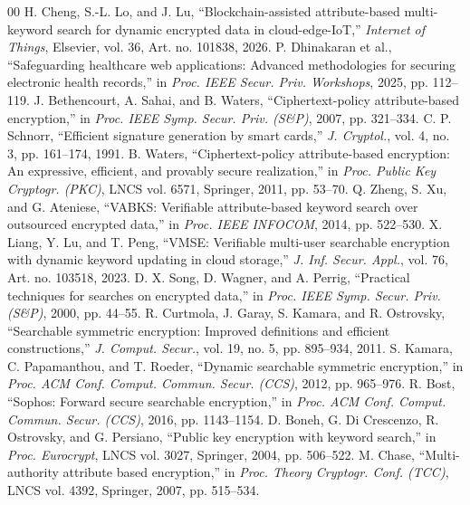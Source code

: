 \documentclass[journal,10pt,twocolumn]{IEEEtran}
\begin{document}

\begin{thebibliography}{00}
 H. Cheng, S.-L. Lo, and J. Lu, ``Blockchain-assisted attribute-based multi-keyword search for dynamic encrypted data in cloud-edge-IoT,'' \textit{Internet of Things}, Elsevier, vol. 36, Art. no. 101838, 2026.
 P. Dhinakaran et al., ``Safeguarding healthcare web applications: Advanced methodologies for securing electronic health records,'' in \textit{Proc. IEEE Secur. Priv. Workshops}, 2025, pp. 112–119.
 J. Bethencourt, A. Sahai, and B. Waters, ``Ciphertext-policy attribute-based encryption,'' in \textit{Proc. IEEE Symp. Secur. Priv. (S\&P)}, 2007, pp. 321–334.
 C. P. Schnorr, ``Efficient signature generation by smart cards,'' \textit{J. Cryptol.}, vol. 4, no. 3, pp. 161–174, 1991.
 B. Waters, ``Ciphertext-policy attribute-based encryption: An expressive, efficient, and provably secure realization,'' in \textit{Proc. Public Key Cryptogr. (PKC)}, LNCS vol. 6571, Springer, 2011, pp. 53–70.
 Q. Zheng, S. Xu, and G. Ateniese, ``VABKS: Verifiable attribute-based keyword search over outsourced encrypted data,'' in \textit{Proc. IEEE INFOCOM}, 2014, pp. 522–530.
 X. Liang, Y. Lu, and T. Peng, ``VMSE: Verifiable multi-user searchable encryption with dynamic keyword updating in cloud storage,'' \textit{J. Inf. Secur. Appl.}, vol. 76, Art. no. 103518, 2023.
 D. X. Song, D. Wagner, and A. Perrig, ``Practical techniques for searches on encrypted data,'' in \textit{Proc. IEEE Symp. Secur. Priv. (S\&P)}, 2000, pp. 44–55.
 R. Curtmola, J. Garay, S. Kamara, and R. Ostrovsky, ``Searchable symmetric encryption: Improved definitions and efficient constructions,'' \textit{J. Comput. Secur.}, vol. 19, no. 5, pp. 895–934, 2011.
 S. Kamara, C. Papamanthou, and T. Roeder, ``Dynamic searchable symmetric encryption,'' in \textit{Proc. ACM Conf. Comput. Commun. Secur. (CCS)}, 2012, pp. 965–976.
 R. Bost, ``Sophos: Forward secure searchable encryption,'' in \textit{Proc. ACM Conf. Comput. Commun. Secur. (CCS)}, 2016, pp. 1143–1154.
 D. Boneh, G. Di Crescenzo, R. Ostrovsky, and G. Persiano, ``Public key encryption with keyword search,'' in \textit{Proc. Eurocrypt}, LNCS vol. 3027, Springer, 2004, pp. 506–522.
 M. Chase, ``Multi-authority attribute based encryption,'' in \textit{Proc. Theory Cryptogr. Conf. (TCC)}, LNCS vol. 4392, Springer, 2007, pp. 515–534.

\end{thebibliography}
\end{document}
